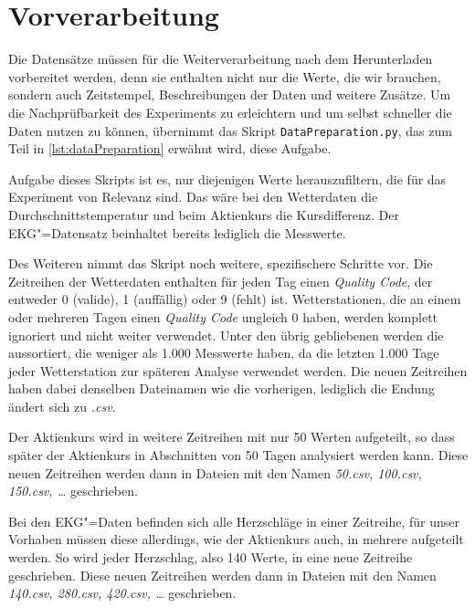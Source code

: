 \section{Vorverarbeitung}
Die Datensätze müssen für die Weiterverarbeitung nach dem Herunterladen vorbereitet werden, denn sie enthalten nicht nur die Werte, die wir brauchen, sondern auch Zeitstempel, Beschreibungen der Daten und weitere Zusätze. Um die Nachprüfbarkeit des Experiments zu erleichtern und um selbst schneller die Daten nutzen zu können, übernimmt das Skript \lstinline|DataPreparation.py|, das zum Teil in \autoref{lst:dataPreparation} erwähnt wird, diese Aufgabe.

Aufgabe dieses Skripts ist es, nur diejenigen Werte herauszufiltern, die für das Experiment von Relevanz sind. Das wäre bei den Wetterdaten die Durchschnittstemperatur und beim Aktienkurs die Kursdifferenz. Der EKG"=Datensatz beinhaltet bereits lediglich die Messwerte. 

Des Weiteren nimmt das Skript noch weitere, spezifischere Schritte vor. Die Zeitreihen der Wetterdaten enthalten für jeden Tag einen \textit{Quality Code}, der entweder 0 (valide), 1 (auffällig) oder 9 (fehlt) ist. Wetterstationen, die an einem oder mehreren Tagen einen \textit{Quality Code} ungleich 0 haben, werden komplett ignoriert und nicht weiter verwendet. Unter den übrig gebliebenen werden die aussortiert, die weniger als 1.000 Messwerte haben, da die letzten 1.000 Tage jeder Wetterstation zur späteren Analyse verwendet werden. Die neuen Zeitreihen haben dabei denselben Dateinamen wie die vorherigen, lediglich die Endung ändert sich zu \textit{.csv}.

Der Aktienkurs wird in weitere Zeitreihen mit nur 50 Werten aufgeteilt, so dass später der Aktienkurs in Abschnitten von 50 Tagen analysiert werden kann. Diese neuen Zeitreihen werden dann in Dateien mit den Namen \textit{50.csv, 100.csv, 150.csv, \dots} geschrieben.

Bei den EKG"=Daten befinden sich alle Herzschläge in einer Zeitreihe, für unser Vorhaben müssen diese allerdings, wie der Aktienkurs auch, in mehrere aufgeteilt werden. So wird jeder Herzschlag, also 140 Werte, in eine neue Zeitreihe geschrieben. Diese neuen Zeitreihen werden dann in Dateien mit den Namen \textit{140.csv, 280.csv, 420.csv, \dots} geschrieben.